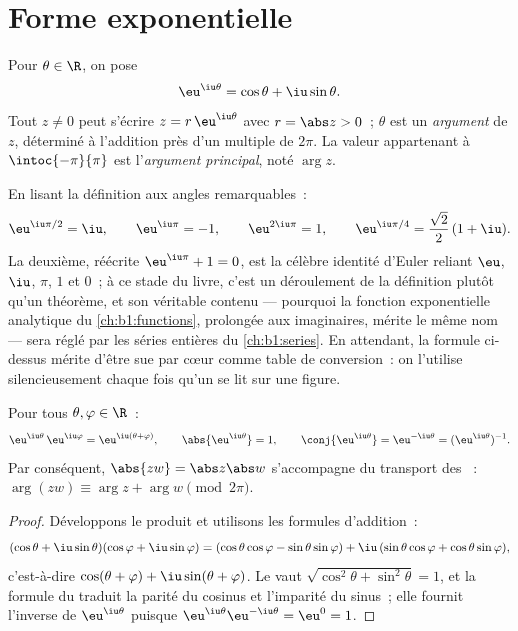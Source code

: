\section{Forme exponentielle}

\begin{definition}\label{def:b1:complex:expi}
Pour $\theta \in \R$, on pose
\[
\eu^{\iu\theta} = \cos\theta + \iu \sin\theta .
\]
Tout $z \neq 0$ peut s'écrire $z = r\,\eu^{\iu\theta}$ avec $r =
\abs z > 0$~; $\theta$ est un \emph{argument} de $z$,
déterminé à l'addition près d'un multiple de $2\pi$. La valeur
appartenant à $\intoc{-\pi}{\pi}$ est l'\emph{argument principal},
noté $\arg z$.
\end{definition}

\begin{example}\label{ex:b1:complex:eulerid}
En lisant la définition aux angles remarquables~:
\[
\eu^{\iu\pi/2} = \iu, \qquad
\eu^{\iu\pi} = -1, \qquad
\eu^{2\iu\pi} = 1, \qquad
\eu^{\iu\pi/4} = \frac{\sqrt2}2\,(1 + \iu) .
\]
La deuxième, réécrite $\eu^{\iu\pi} + 1 = 0$, est la célèbre
identité d'Euler reliant $\eu$, $\iu$, $\pi$, $1$ et $0$~; à ce
stade du livre, c'est un déroulement de la définition plutôt qu'un
théorème, et son véritable contenu --- pourquoi la fonction
exponentielle analytique du \cref{ch:b1:functions}, prolongée aux
 imaginaires, mérite le même nom --- sera réglé par les
séries entières du \cref{ch:b1:series}. En attendant, la formule
ci-dessus mérite d'être sue par cœur comme table de conversion~:
on l'utilise silencieusement chaque fois qu'un  se lit sur
une figure.
\end{example}

\begin{theorem}\label{thm:b1:complex:funceq}
Pour tous $\theta, \varphi \in \R$~:
\[
\eu^{\iu\theta}\, \eu^{\iu\varphi} = \eu^{\iu(\theta + \varphi)},
\qquad
\abs{\eu^{\iu\theta}} = 1,
\qquad
\conj{\eu^{\iu\theta}} = \eu^{-\iu\theta} = (\eu^{\iu\theta})^{-1}.
\]
Par conséquent, $\abs{zw} = \abs z \abs w$ s'accompagne du transport
des ~: $\arg(zw) \equiv \arg z + \arg w \pmod{2\pi}$.
\end{theorem}

\begin{proof}
Développons le produit et utilisons les formules d'addition~:
\[
(\cos\theta + \iu\sin\theta)(\cos\varphi + \iu\sin\varphi)
= (\cos\theta\cos\varphi - \sin\theta\sin\varphi)
+ \iu\,(\sin\theta\cos\varphi + \cos\theta\sin\varphi),
\]
c'est-à-dire $\cos(\theta+\varphi) + \iu\sin(\theta+\varphi)$. Le
 vaut $\sqrt{\cos^2\theta + \sin^2\theta} = 1$, et la formule du
 traduit la parité du cosinus et l'imparité du sinus~; elle
fournit l'inverse de $\eu^{\iu\theta}$ puisque
$\eu^{\iu\theta}\eu^{-\iu\theta} = \eu^0 = 1$.
\end{proof}

